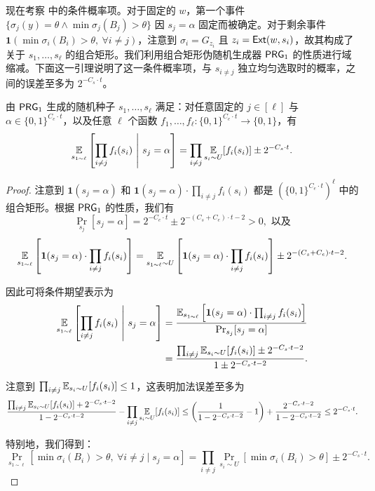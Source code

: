 现在考察  中的条件概率项。对于固定的 $w$，第一个事件 $\{\sigma_j(y) = \theta \wedge \min \sigma_j(B_j) > \theta\}$ 因 $s_j = \alpha$ 固定而被确定。对于剩余事件 $\mathbf{1}(\min \sigma_i(B_i) > \theta,\ \forall i \ne j)$，注意到 $\sigma_i = G_{z_i}$ 且 $z_i = \mathsf{Ext}(w, s_i)$，故其构成了关于 $s_1, \ldots, s_\ell$ 的组合矩形。我们利用组合矩形伪随机生成器 $\mathsf{PRG}_1$ 的性质进行域缩减。下面这一引理说明了这一条件概率项，与 $s_{i \ne j}$ 独立均匀选取时的概率，之间的误差至多为 $2^{-C_s \cdot t}$。

\begin{lemma}\label{lem:PRG_CR_LOG}
    由 $\mathsf{PRG}_1$ 生成的随机种子 $s_1, \ldots, s_\ell$ 满足：对任意固定的 $j \in [\ell]$ 与 $\alpha \in \{0, 1\}^{C_e \cdot t}$，以及任意 $\ell$ 个函数 $f_1, \ldots, f_\ell : \{0, 1\}^{C_e \cdot t} \to \{0, 1\}$，有
    $$
    \operatorname*{\mathbb{E}}_{s_{1 \sim \ell}}\left[ \prod_{i \ne j}f_i(s_i)\ \middle|\ s_j=\alpha \right] = \prod_{i \ne j} \operatorname*{\mathbb{E}}_{s_i \sim U}[f_i(s_i)] \pm 2^{-C_s \cdot t}.
    $$
\end{lemma}

\begin{proof}
    注意到 $\mathbf{1}(s_j = \alpha)$ 和 $\mathbf{1}(s_j = \alpha) \cdot \prod_{i \ne j} f_i(s_i)$ 都是 $\left( \{0, 1\}^{C_e \cdot t} \right)^\ell$ 中的组合矩形。根据 $\mathsf{PRG}_1$ 的性质，我们有
    $$
    \Pr_{s_j}[s_j = \alpha] = 2^{-C_e \cdot t} \pm 2^{-(C_s + C_e) \cdot t - 2} > 0, \text{\ 以及}
    $$
    $$
    \operatorname*{\mathbb{E}}_{s_{1 \sim \ell}}\left[ \mathbf{1}(s_j = \alpha) \cdot \prod_{i \ne j} f_i(s_i) \right] = \operatorname*{\mathbb{E}}_{s_{1 \sim \ell} \sim U}\left[ \mathbf{1}(s_j = \alpha) \cdot \prod_{i \ne j} f_i(s_i) \right] \pm 2^{-(C_s + C_e) \cdot t - 2}.
    $$

    因此可将条件期望表示为
    \begin{align*}
        \E_{s_{1 \sim \ell}}\left[ \prod_{i \ne j}f_i(s_i)\ \middle|\ s_j=\alpha \right] & = \frac{\E_{s_{1 \sim \ell}}\left[ \mathbf{1}(s_j = \alpha) \cdot \prod_{i \ne j}f_i(s_i) \right]}{\Pr_{s_j}[s_j = \alpha]} \\
         & = \frac{\prod_{i \ne j} \E_{s_i \sim U}[f_i(s_i)] \pm 2^{-C_s \cdot t - 2}}{1 \pm 2^{-C_s \cdot t - 2}}.
    \end{align*}

    注意到 $\prod_{i \ne j} \operatorname*{\mathbb{E}}_{s_i \sim U}[f_i(s_i)] \le 1$，这表明加法误差至多为
    $$
    \frac{\prod_{i \ne j} \operatorname*{\mathbb{E}}_{s_i \sim U}[f_i(s_i)] + 2^{-C_s \cdot t - 2}}{1 - 2^{-C_s \cdot t - 2}} - \prod_{i \ne j} \operatorname*{\mathbb{E}}_{s_i \sim U}[f_i(s_i)] \le \left( \frac{1}{1 - 2^{-C_s \cdot t - 2}} - 1 \right) + \frac{2^{-C_s \cdot t - 2}}{1 - 2^{-C_s \cdot t - 2}} \le 2^{-C_s \cdot t}.
    $$

    特别地，我们得到：
    \begin{equation}
        \Pr_{s_{1 \sim \ell}} [ \min \sigma_i(B_i) > \theta,\ \forall i \ne j \mid s_j = \alpha ] = \prod_{i \ne j}\Pr_{s_i \sim U}[\min \sigma_i(B_i) > \theta ] \pm 2^{-C_s \cdot t}. \label{eq:applying_domain_reduction}
    \end{equation}
\end{proof}

